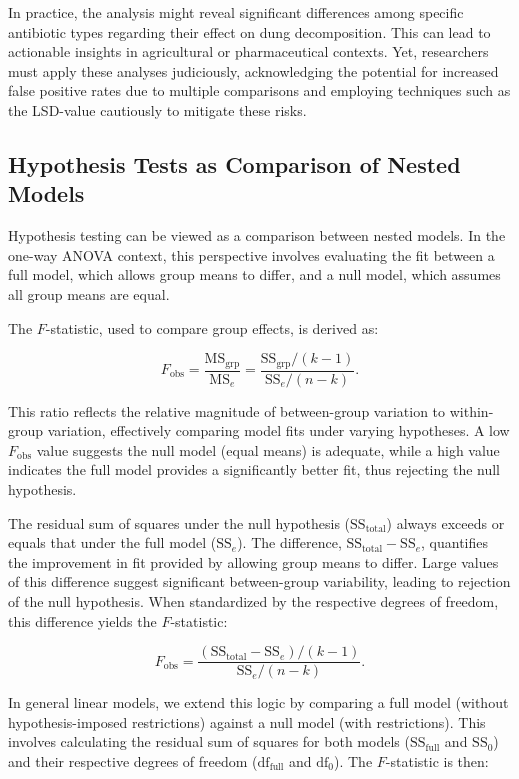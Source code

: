 \documentclass{article}
\begin{document}
In practice, the analysis might reveal significant differences among specific antibiotic types regarding their effect on dung decomposition. This can lead to actionable insights in agricultural or pharmaceutical contexts. Yet, researchers must apply these analyses judiciously, acknowledging the potential for increased false positive rates due to multiple comparisons and employing techniques such as the LSD-value cautiously to mitigate these risks.

\subsection{Hypothesis Tests as Comparison of Nested Models}

Hypothesis testing can be viewed as a comparison between nested models. In the one-way ANOVA context, this perspective involves evaluating the fit between a full model, which allows group means to differ, and a null model, which assumes all group means are equal.

The $F$-statistic, used to compare group effects, is derived as:

\[
F_{\mathrm{obs}} = \frac{\text{MS}_{\text{grp}}}{\text{MS}_{e}} = \frac{\text{SS}_{\text{grp}} / (k - 1)}{\text{SS}_{e} / (n - k)}.
\]

This ratio reflects the relative magnitude of between-group variation to within-group variation, effectively comparing model fits under varying hypotheses. A low $F_{\mathrm{obs}}$ value suggests the null model (equal means) is adequate, while a high value indicates the full model provides a significantly better fit, thus rejecting the null hypothesis.

The residual sum of squares under the null hypothesis ($\text{SS}_{\text{total}}$) always exceeds or equals that under the full model ($\text{SS}_{e}$). The difference, $\text{SS}_{\text{total}} - \text{SS}_{e}$, quantifies the improvement in fit provided by allowing group means to differ. Large values of this difference suggest significant between-group variability, leading to rejection of the null hypothesis. When standardized by the respective degrees of freedom, this difference yields the $F$-statistic:

\[
F_{\mathrm{obs}} = \frac{(\text{SS}_{\text{total}} - \text{SS}_{e}) / (k - 1)}{\text{SS}_{e} / (n - k)}.
\]

In general linear models, we extend this logic by comparing a full model (without hypothesis-imposed restrictions) against a null model (with restrictions). This involves calculating the residual sum of squares for both models ($\text{SS}_{\text{full}}$ and $\text{SS}_{0}$) and their respective degrees of freedom ($\text{df}_{\text{full}}$ and $\text{df}_{0}$). The $F$-statistic is then:
\end{document}
